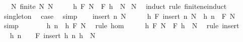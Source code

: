 \begin{isabellebody}
\ \ \ N{\isacharcolon}{\kern0pt}\ {\isachardoublequoteopen}finite\ N{\isachardoublequoteclose}\ {\isachardoublequoteopen}N\ {\isasymnoteq}\ {\isacharbraceleft}{\kern0pt}{\isacharbraceright}{\kern0pt}{\isachardoublequoteclose}\isanewline
\ \ \ {\isachardoublequoteopen}h\ {\isacharparenleft}{\kern0pt}F\ N{\isacharparenright}{\kern0pt}\ {\isacharequal}{\kern0pt}\ F\ {\isacharparenleft}{\kern0pt}h\ {\isacharbackquote}{\kern0pt}\ N{\isacharparenright}{\kern0pt}{\isachardoublequoteclose}\isanewline
%
\isadelimproof
%
\endisadelimproof
%
\isatagproof
{}\isamarkupfalse%
\ N\ \isamarkupfalse%
\ {\isacharparenleft}{\kern0pt}induct\ rule{\isacharcolon}{\kern0pt}\ finite{\isacharunderscore}{\kern0pt}ne{\isacharunderscore}{\kern0pt}induct{\isacharparenright}{\kern0pt}\isanewline
\ \ \isamarkupfalse%
\ singleton\ \isamarkupfalse%
\ {\isacharquery}{\kern0pt}case\ \isamarkupfalse%
\ simp\isanewline
{}\isamarkupfalse%
\isanewline
\ \ \isamarkupfalse%
\ {\isacharparenleft}{\kern0pt}insert\ n\ N{\isacharparenright}{\kern0pt}\isanewline
\ \ \isamarkupfalse%
\ \isamarkupfalse%
\ {\isachardoublequoteopen}h\ {\isacharparenleft}{\kern0pt}F\ {\isacharparenleft}{\kern0pt}insert\ n\ N{\isacharparenright}{\kern0pt}{\isacharparenright}{\kern0pt}\ {\isacharequal}{\kern0pt}\ h\ {\isacharparenleft}{\kern0pt}n\ \isactrlbold {\isacharasterisk}{\kern0pt}\ F\ N{\isacharparenright}{\kern0pt}{\isachardoublequoteclose}\ \isamarkupfalse%
\ simp\isanewline
\ \ \isamarkupfalse%
\ \isamarkupfalse%
\ {\isachardoublequoteopen}{\isasymdots}\ {\isacharequal}{\kern0pt}\ h\ n\ \isactrlbold {\isacharasterisk}{\kern0pt}\ h\ {\isacharparenleft}{\kern0pt}F\ N{\isacharparenright}{\kern0pt}{\isachardoublequoteclose}\ \isamarkupfalse%
\ {\isacharparenleft}{\kern0pt}rule\ hom{\isacharparenright}{\kern0pt}\isanewline
\ \ \isamarkupfalse%
\ \isamarkupfalse%
\ {\isachardoublequoteopen}h\ {\isacharparenleft}{\kern0pt}F\ N{\isacharparenright}{\kern0pt}\ {\isacharequal}{\kern0pt}\ F\ {\isacharparenleft}{\kern0pt}h\ {\isacharbackquote}{\kern0pt}\ N{\isacharparenright}{\kern0pt}{\isachardoublequoteclose}\ \isamarkupfalse%
\ {\isacharparenleft}{\kern0pt}rule\ insert{\isacharparenright}{\kern0pt}\isanewline
\ \ \isamarkupfalse%
\ \isamarkupfalse%
\ {\isachardoublequoteopen}h\ n\ \isactrlbold {\isacharasterisk}{\kern0pt}\ {\isasymdots}\ {\isacharequal}{\kern0pt}\ F\ {\isacharparenleft}{\kern0pt}insert\ {\isacharparenleft}{\kern0pt}h\ n{\isacharparenright}{\kern0pt}\ {\isacharparenleft}{\kern0pt}h\ {\isacharbackquote}{\kern0pt}\ N{\isacharparenright}{\kern0pt}{\isacharparenright}{\kern0pt}{\isachardoublequoteclose}\isanewline

\end{isabellebody}

